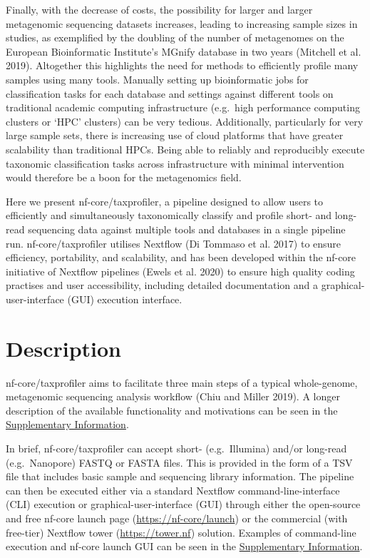 \documentclass[
]{article}
\begin{document}
Finally, with the decrease of costs, the possibility for larger and
larger metagenomic sequencing datasets increases, leading to increasing
sample sizes in studies, as exemplified by the doubling of the number of
metagenomes on the European Bioinformatic Institute's MGnify database in
two years (Mitchell et al. 2019). Altogether this highlights the need
for methods to efficiently profile many samples using many tools.
Manually setting up bioinformatic jobs for classification tasks for each
database and settings against different tools on traditional academic
computing infrastructure (e.g.~high performance computing clusters or
`HPC' clusters) can be very tedious. Additionally, particularly for very
large sample sets, there is increasing use of cloud platforms that have
greater scalability than traditional HPCs. Being able to reliably and
reproducibly execute taxonomic classification tasks across
infrastructure with minimal intervention would therefore be a boon for
the metagenomics field.

Here we present nf-core/taxprofiler, a pipeline designed to allow users
to efficiently and simultaneously taxonomically classify and profile
short- and long-read sequencing data against multiple tools and
databases in a single pipeline run. nf-core/taxprofiler utilises
Nextflow (Di Tommaso et al. 2017) to ensure efficiency, portability, and
scalability, and has been developed within the nf-core initiative of
Nextflow pipelines (Ewels et al. 2020) to ensure high quality coding
practises and user accessibility, including detailed documentation and a
graphical-user-interface (GUI) execution interface.

\hypertarget{description}{%
\section{Description}\label{description}}

nf-core/taxprofiler aims to facilitate three main steps of a typical
whole-genome, metagenomic sequencing analysis workflow (Chiu and Miller
2019). A longer description of the available functionality and
motivations can be seen in the
\protect\hyperlink{supplementary-information}{Supplementary
Information}.

In brief, nf-core/taxprofiler can accept short- (e.g.~Illumina) and/or
long-read (e.g.~Nanopore) FASTQ or FASTA files. This is provided in the
form of a TSV file that includes basic sample and sequencing library
information. The pipeline can then be executed either via a standard
Nextflow command-line-interface (CLI) execution or
graphical-user-interface (GUI) through either the open-source and free
nf-core launch page (\url{https://nf-core/launch}) or the commercial
(with free-tier) Nextflow tower (\url{https://tower.nf}) solution.
Examples of command-line execution and nf-core launch GUI can be seen in
the \protect\hyperlink{supplementary-information}{Supplementary
Information}.
\end{document}
